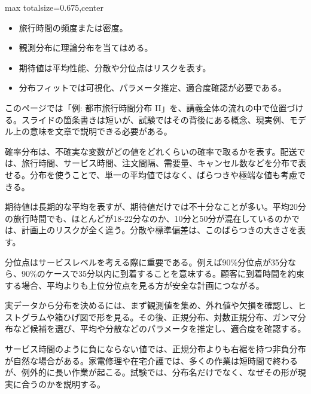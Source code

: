 \clearpage
{}
\begin{adjustbox}{max totalsize={\textwidth}{0.675\textheight},center}
\begin{minipage}{\textwidth}\scriptsize
\begin{minipage}[t]{0.485\textwidth}
\begin{itemize}
\item 旅行時間の頻度または密度。
\item 観測分布に理論分布を当てはめる。
\end{itemize}
\begin{itemize}
\item 期待値は平均性能、分散や分位点はリスクを表す。
\item 分布フィットでは可視化、パラメータ推定、適合度確認が必要である。
\end{itemize}
\end{minipage}\hfill
\begin{minipage}[t]{0.485\textwidth}
このページでは「例: 都市旅行時間分布 II」を、講義全体の流れの中で位置づける。スライドの箇条書きは短いが、試験ではその背後にある概念、現実例、モデル上の意味を文章で説明できる必要がある。\par
確率分布は、不確実な変数がどの値をどれくらいの確率で取るかを表す。配送では、旅行時間、サービス時間、注文間隔、需要量、キャンセル数などを分布で表せる。分布を使うことで、単一の平均値ではなく、ばらつきや極端な値も考慮できる。\par
期待値は長期的な平均を表すが、期待値だけでは不十分なことが多い。平均20分の旅行時間でも、ほとんどが18-22分なのか、10分と50分が混在しているのかでは、計画上のリスクが全く違う。分散や標準偏差は、このばらつきの大きさを表す。\par
分位点はサービスレベルを考える際に重要である。例えば90\%分位点が35分なら、90\%のケースで35分以内に到着することを意味する。顧客に到着時間を約束する場合、平均よりも上位分位点を見る方が安全な計画につながる。\par
実データから分布を決めるには、まず観測値を集め、外れ値や欠損を確認し、ヒストグラムや箱ひげ図で形を見る。その後、正規分布、対数正規分布、ガンマ分布など候補を選び、平均や分散などのパラメータを推定し、適合度を確認する。\par
サービス時間のように負にならない値では、正規分布よりも右裾を持つ非負分布が自然な場合がある。家電修理や在宅介護では、多くの作業は短時間で終わるが、例外的に長い作業が起こる。試験では、分布名だけでなく、なぜその形が現実に合うのかを説明する。\par

\end{minipage}
\end{minipage}
\end{adjustbox}

